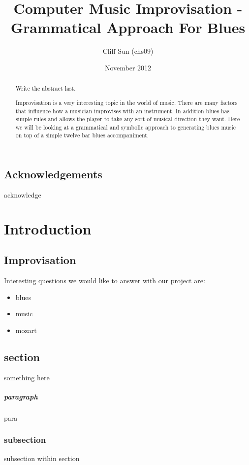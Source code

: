 \documentclass[pdftex,12pt,a4paper]{report}
\begin{document}
\title{Computer Music Improvisation - Grammatical Approach For Blues}
\author{Cliff Sun (chs09)}
\date{November 2012}
\maketitle

\begin{abstract}

Write the abstract last.



Improvisation is a very interesting topic in the world of music. There are many factors that influence how a musician improvises with an instrument. In addition blues has simple rules and allows the player to take any sort of musical direction they want. Here we will be looking at a grammatical and symbolic approach to generating blues music on top of a  simple twelve bar blues accompaniment. 

\end{abstract}

\setcounter{tocdepth}{2} %

\tableofcontents

\pagebreak

\renewcommand*\thesection{\arabic{section}}

\section{Acknowledgements}

acknowledge

\pagebreak

\chapter{Introduction}

\section{Improvisation}

Interesting questions we would like to answer with our project are:
\begin{itemize}

\item blues

\item music

\item mozart

\end{itemize}

\section{section}

something here

\paragraph{paragraph}
para

\subsection{subsection}

subsection within section

\pagebreak
\end{document}
